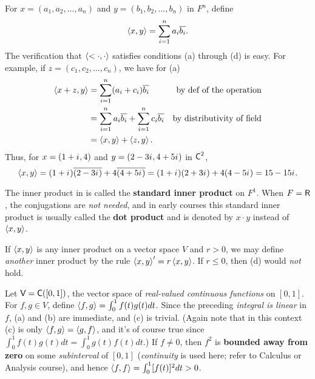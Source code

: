 \begin{example} \label{example 6.1.1}
For \(x = (a_1, a_2, ..., a_n)\) and \(y = (b_1, b_2, ..., b_n)\) in \(F^n\), define
\[
    \left< x, y \right> = \sum_{i = 1}^n a_i \overline{b_i}.
\]
The verification that \(\left<< \cdot, \cdot \right>\) satisfies conditions (a) through (d) is easy.
For example, if \(z = (c_1, c_2, ..., c_n)\), we have for (a)
\begin{align*}
    \left< x + z, y \right> & = \sum_{i = 1}^n (a_i + c_i) \overline{b_i} & \text{by def of the operation} \\
    & = \sum_{i = 1}^n a_i \overline{b_i} + \sum_{i = 1}^n c_i \overline{b_i} & \text{by distributivity of field} \\
    & = \left< x, y \right> + \left< z, y \right>.
\end{align*}
Thus, for \(x = (1 + {i\mkern1mu}, 4)\) and \(y = (2 - 3{i\mkern1mu}, 4 + 5{i\mkern1mu})\) in \(\textsf{C}^2\),
\[
    \left< x, y \right> = (1 + {i\mkern1mu})\overline{(2 - 3{i\mkern1mu})} + 4\overline{(4 + 5{i\mkern1mu})} = (1 + {i\mkern1mu})(2 + 3{i\mkern1mu}) + 4(4 - 5{i\mkern1mu}) = 15 - 15{i\mkern1mu}.
\]
\end{example}

\begin{remark} \label{remark 6.1.2}
The inner product in  is called the \textbf{standard inner product} on \(F^1\).
When \(F = \textsf{R}\), the conjugations are \emph{not needed}, and in early courses this standard inner product is usually called the \textbf{dot product} and is denoted by \(x \cdot y\) instead of \(\left< x,y \right>\).
\end{remark}

\begin{example} \label{example 6.1.2}
If \(\left< x, y \right>\) is any inner product on a vector space \(V\) and \(r > 0\), we may define \emph{another} inner product by the rule \(\left< x, y \right>' = r \left< x, y \right>\).
If \(r \le 0\), then (d) would \emph{not} hold.
\end{example}

\begin{example} \label{example 6.1.3}
Let \(\textsf{V} = \textsf{C}([0, 1])\), the vector space of \emph{real-valued continuous functions} on \([0, 1]\).
For \(f, g \in V\), define \(\left< f, g \right> = \int_0^1 f(t)g(t) dt\).
Since the preceding \emph{integral is linear} in \(f\), (a) and (b) are immediate, and (c) is trivial.
(Again note that in this context (c) is only \(\left< f, g \right> = \left< g, f \right>\), and it's of course true since \(\int_0^1 f(t)g(t) dt = \int_0^1 g(t)f(t) dt\).)
If \(f \ne 0\), then \(f^2\) is \textbf{bounded away from zero} on some \emph{subinterval} of \([0, 1]\) (\emph{continuity} is used here; refer to Calculus or Analysis course), and hence \(\left< f, f \right> = \int_0^1 [f(t)]^2 dt > 0\).
\end{example}

